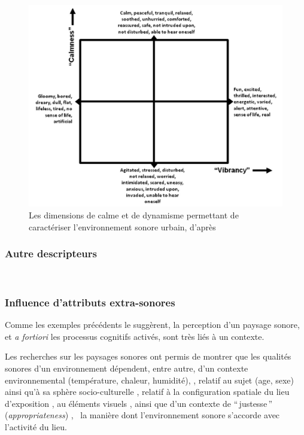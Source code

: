\begin{figure}[t]
        \myfloatalign
        \includegraphics[width=.8\linewidth]{gfx/calmVibran}
        \caption{Les dimensions de calme et de dynamisme permettant de caractériser l'environnement sonore urbain, d'après \citep{cain2013development}}\label{fig:calmVibran}
\end{figure}

\subsubsection{Autre descripteurs}

 \\

\subsubsection{Influence d'attributs extra-sonores}
\label{sec:ch3_contexteDimension}

Comme les exemples précédents le suggèrent, la perception d'un paysage sonore, et \emph{a fortiori} les processus cognitifs activés, sont très liés à un contexte.

Les recherches sur les paysages sonores ont permis de montrer que les qualités sonores d'un environnement dépendent, entre autre, d'un contexte environnemental (température, chaleur, humidité), \citep{meng2013field,jeon2011non}, relatif au sujet (age, sexe) ainsi qu'à sa sphère socio-culturelle
\citep{hall2013exploratory,yu2010factors,guillen2007importance}, relatif à la configuration spatiale du lieu d'exposition  \citep{hall2013exploratory}, au éléments visuels \citep{de2006quiet,guillen2007importance}, ainsi que d'un contexte de ``\,justesse\,'' (\emph{appropriateness}) \citep{nielbo2013investigating,de2006quiet}, \ie~la manière dont l'environnement sonore s'accorde avec l'activité du lieu.
 
